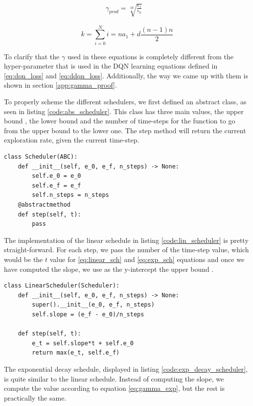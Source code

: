 \begin{align}
	\gamma_{prod} = \sqrt[\lambda k]{\frac{\epsilon_f}{\epsilon_0}} \quad \label{eq:gamma_pexp}
\end{align}

\begin{equation}
	\label{eq:k_sum}
	k = \sum_{i=0}^{N} i  = n a_1 + d \frac{(n-1)n}{2}
\end{equation}

To clarify that the $\gamma$ used in these equations is completely different from the hyper-parameter that is used in the DQN learning equations defined in \ref{eq:dqn_loss} and \ref{eq:ddqn_loss}. Additionally, the way we came up with them is shown in section \ref{app:gamma_proof}.

To properly scheme the different schedulers, we first defined an abstract class, as seen in listing \ref{code:abs_scheduler}. This class has three main values, the upper bound , the lower bound  and the number of time-steps for the function to go from the upper bound to the lower one. The step method will return the current exploration rate, given the current time-step.
\begin{lstlisting}[caption={Abstract class for the scheduler}, label={code:abs_scheduler}]
class Scheduler(ABC):
	def __init__(self, e_0, e_f, n_steps) -> None:
		self.e_0 = e_0
		self.e_f = e_f
		self.n_steps = n_steps
	@abstractmethod
	def step(self, t):
		pass
\end{lstlisting}

The implementation of the linear schedule in listing \ref{code:lin_scheduler} is pretty straight-forward. For each step, we pass the number of the time-step value, which would be the $t$ value for \ref{eq:linear_sch} and \ref{eq:exp_sch} equations and once we have computed the slope, we use as the y-intercept the upper bound . 

\begin{lstlisting}[caption={Linear scheduler class}, label={code:lin_scheduler}]
class LinearScheduler(Scheduler):
	def __init__(self, e_0, e_f, n_steps) -> None:
		super().__init__(e_0, e_f, n_steps)
		self.slope = (e_f - e_0)/n_steps
	
	def step(self, t):
		e_t = self.slope*t + self.e_0
		return max(e_t, self.e_f)
\end{lstlisting}

The exponential decay schedule, displayed in listing \ref{code:exp_decay_scheduler}, is quite similar to the linear schedule. Instead of computing the slope, we compute the  value according to equation \ref{eq:gamma_exp}, but the rest is practically the same.

